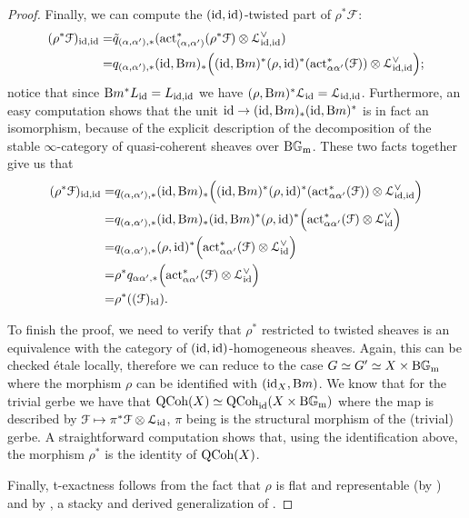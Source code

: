 \documentclass[11pt, twoside]{article} %
\numberwithin{equation}{section}
\theoremstyle{plain}
\theoremstyle{definition}
\newcommand{\act}{\textup{act}}
\newcommand{\Gm}{\mathbb G_{\mathrm{m}}}
\newcommand{\id}{\textup{id}}
\newcommand{\QCoh}{\textup{QCoh}}
\newcommand{\BGm}{\textup{B}\Gm}
\newcommand{\cF}{{\mathcal F}}
\newcommand{\cL}{\mathcal L}
\begin{document}
\begin{proof}
		Finally, we can compute the $(\id,\id)$-twisted part of $\rho^*\cF$: 
		\begin{equation*}
			\begin{split}
				(\rho^*\cF)_{\id,\id}=& \tilde{q}_{(\alpha,\alpha'),*}(\act^*_{(\alpha,\alpha')}(\rho^*\cF)\otimes \cL_{\id,\id}^{\vee}) \\ =&
				q_{(\alpha,\alpha'),*}(\id,\textup{B}m)_*\Big( (\id,\textup{B}m)^*(\rho,\id)^*(\act_{\alpha\alpha'}^*(\cF))\otimes \cL_{\id,\id}^{\vee} \Big);
			\end{split}
		\end{equation*}
		notice that since $\textup{B}m^* L_{\id} = L_{\id,\id}$ we have $(\rho,\textup{B}m)^*\cL_{\id}=\cL_{\id,\id}$. Furthermore, an easy computation shows that the unit $\id \rightarrow (\id,\textup{B}m)_*(\id,\textup{B}m)^*$ is in fact an isomorphism,  because of the explicit description of the decomposition of the stable $\infty$-category of quasi-coherent sheaves over $\BGm$. These two facts together give us that 
		\begin{equation*}
			\begin{split}
				(\rho^*\cF)_{\id,\id}=& 
				q_{(\alpha,\alpha'),*}(\id,\textup{B}m)_*\Big( (\id,\textup{B}m)^*(\rho,\id)^*(\act_{\alpha\alpha'}^*(\cF))\otimes \cL_{\id,\id}^{\vee} \Big) \\ =&  q_{(\alpha,\alpha'),*}(\id,\textup{B}m)_*(\id,\textup{B}m)^*(\rho,\id)^*\Big( \act_{\alpha\alpha'}^*(\cF)\otimes \cL_{\id}^{\vee} \Big) \\ =&
				q_{(\alpha,\alpha'),*}(\rho,\id)^*\Big(\act^*_{\alpha\alpha'}(\cF)\otimes \cL_{\id}^{\vee}\Big) \\ =& 
				\rho^*q_{\alpha\alpha',*}\Big(\act^*_{\alpha\alpha'}(\cF)\otimes \cL_{\id}^{\vee}\Big) \\ =& 
				\rho^*( (\cF)_{\id} ).
			\end{split}
		\end{equation*}

        
		To finish the proof, we need to verify that $\rho^*$ restricted to twisted sheaves is an equivalence with the category of $(\id,\id)$-homogeneous sheaves.  Again, this can be checked \'etale locally, therefore we can reduce to the case $G\simeq G' \simeq X \times \BGm$ where the morphism $\rho$ can be identified with $(\id_X,\textup{B}m)$. We know that for the trivial gerbe we have that $\QCoh(X) \simeq \QCoh_{\id}(X\times \BGm)$ where the map is described by $ \cF \mapsto \pi^*\cF \otimes \cL_{\id}$, $\pi$ being is the structural morphism of the (trivial) gerbe. A straightforward computation shows that, using the identification above, the morphism $\rho^*$ is the identity of $\QCoh(X)$.
		
		Finally, t-exactness follows from the fact that $\rho$ is flat and representable (by \cite[Theorem A.1]{AOV}) and by \cite[Remark 9.1.3.4]{SAG}, a stacky and derived generalization of \cite[Tag 02KH]{Stacks}.
	\end{proof}
	
\end{document}
